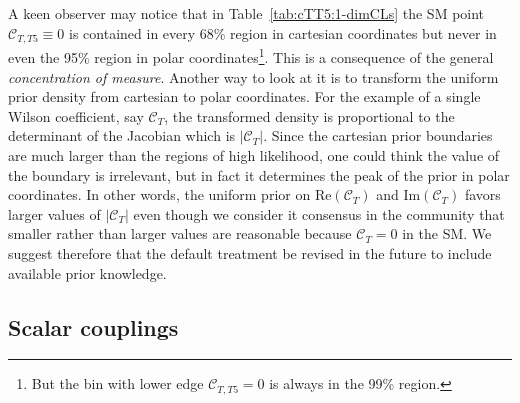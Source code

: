 \documentclass[twocolumn,epjc3]{svjour3}
\numberwithin{equation}{section}
\def \reftab#1{Table~\ref{#1}}
\newcommand{\wilson}[2][{}]{\mathcal{C}_{#2}^{\mathrm{#1}}}
\renewcommand{\[}{\big[}
\renewcommand{\]}{\big]}
\renewcommand{\(}{\big(}
\renewcommand{\)}{\big)}
\begin{document}
A keen observer may notice that in \reftab{tab:cTT5:1-dimCLs} the SM point
$\wilson{T,T5} \equiv 0$ is contained in every 68\% region in cartesian
coordinates but never in even the 95\% region in polar coordinates\footnote{But
  the bin with lower edge $\wilson{T,T5} = 0$ is always in the 99\%
  region.}. This is a consequence of the general \emph{concentration of
  measure}. Another way to look at it is to transform the uniform prior density
from cartesian to polar coordinates. For the example of a single Wilson
coefficient, say $\wilson{T}$, the transformed density is proportional to the
determinant of the Jacobian which is $|\wilson{T}|$. Since the cartesian prior
boundaries are much larger than the regions of high likelihood, one could think
the value of the boundary is irrelevant, but in fact it determines the peak of
the prior in polar coordinates. In other words, the uniform prior on
$\mbox{Re}(\wilson{T})$ and $\mbox{Im}(\wilson{T})$ favors larger values of
$|\wilson{T}|$ even though we consider it consensus in the community that
smaller rather than larger values are reasonable because $\wilson{T} = 0$ in the
SM. We suggest therefore that the default treatment be revised in the future to
include available prior knowledge.

%
%
\subsection{Scalar couplings \label{sec:scalar}}
\end{document}
